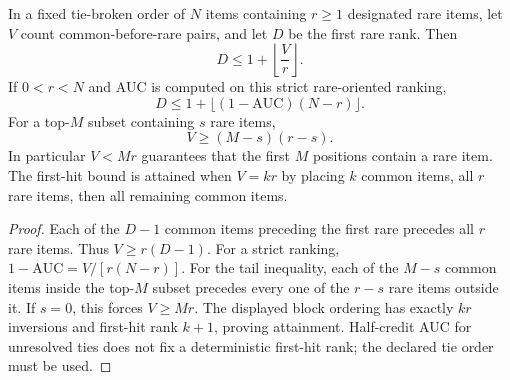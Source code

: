 \begin{proposition}
\label{rthreegeo:rank}
In a fixed tie-broken order of $N$ items containing $r\ge1$ designated
rare items, let $V$ count common-before-rare pairs, and let $D$ be the
first rare rank. Then
\[
 D\le1+\left\lfloor\frac Vr\right\rfloor.
\]
If $0<r<N$ and AUC is computed on this strict rare-oriented ranking,
\[
 D\le1+\lfloor(1-\mathrm{AUC})(N-r)\rfloor.
\]
For a top-$M$ subset containing $s$ rare items,
\[
 V\ge(M-s)(r-s).
\]
In particular $V<Mr$ guarantees that the first $M$ positions contain
a rare item. The first-hit bound is attained when $V=kr$ by placing
$k$ common items, all $r$ rare items, then all remaining common items.
\end{proposition}
\begin{proof}
Each of the $D-1$ common items preceding the first rare precedes all
$r$ rare items. Thus $V\ge r(D-1)$.
For a strict ranking, $1-\mathrm{AUC}=V/[r(N-r)]$.
For the tail inequality, each of the $M-s$ common items inside the
top-$M$ subset precedes every one of the $r-s$ rare items outside it.
If $s=0$, this forces $V\ge Mr$.
The displayed block ordering has exactly $kr$ inversions and first-hit
rank $k+1$, proving attainment. Half-credit AUC for unresolved ties
does not fix a deterministic first-hit rank; the declared tie order
must be used.
\end{proof}
